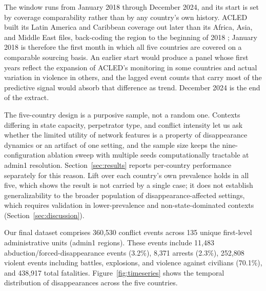 \documentclass[pdflatex,sn-mathphys-num]{sn-jnl}%
\theoremstyle{thmstyleone}%
\theoremstyle{thmstyletwo}%
\theoremstyle{thmstylethree}%
\begin{document}
The window runs from January 2018 through December 2024, and its start is set by coverage comparability rather than by any country's own history. ACLED built its Latin America and Caribbean coverage out later than its Africa, Asia, and Middle East files, back-coding the region to the beginning of 2018 \cite{acledlac2020}; January 2018 is therefore the first month in which all five countries are covered on a comparable sourcing basis. An earlier start would produce a panel whose first years reflect the expansion of ACLED's monitoring in some countries and actual variation in violence in others, and the lagged event counts that carry most of the predictive signal would absorb that difference as trend. December 2024 is the end of the extract.

The five-country design is a purposive sample, not a random one. Contexts differing in state capacity, perpetrator type, and conflict intensity let us ask whether the limited utility of network features is a property of disappearance dynamics or an artifact of one setting, and the sample size keeps the nine-configuration ablation sweep with multiple seeds computationally tractable at admin1 resolution. Section~\ref{sec:results} reports per-country performance separately for this reason. Lift over each country's own prevalence holds in all five, which shows the result is not carried by a single case; it does not establish generalizability to the broader population of disappearance-affected settings, which requires validation in lower-prevalence and non-state-dominated contexts (Section~\ref{sec:discussion}).

Our final dataset comprises 360,530 conflict events across 135 unique first-level administrative units (admin1 regions). These events include 11,483 abduction/forced-disappearance events (3.2\%), 8,371 arrests (2.3\%), 252,808 violent events including battles, explosions, and violence against civilians (70.1\%), and 438,917 total fatalities. Figure~\ref{fig:timeseries} shows the temporal distribution of disappearances across the five countries.
\end{document}
